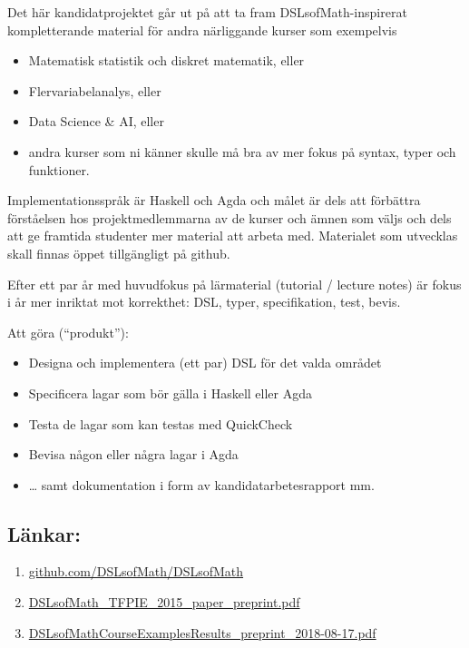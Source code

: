 \documentclass{article}
\providecommand{\tightlist}{%
  \setlength{\itemsep}{0pt}\setlength{\parskip}{0pt}}
\begin{document}
Det här kandidatprojektet går ut på att ta fram DSLsofMath-inspirerat
kompletterande material för andra närliggande kurser som exempelvis

\begin{itemize}
\tightlist
\item
  Matematisk statistik och diskret matematik, eller
\item
  Flervariabelanalys, eller
\item
  Data Science \& AI, eller
\item
  andra kurser som ni känner skulle må bra av mer fokus på syntax, typer
  och funktioner.
\end{itemize}

Implementationsspråk är Haskell och Agda och målet är dels att förbättra
förståelsen hos projekt\-medlemmarna av de kurser och ämnen som väljs och
dels att ge framtida studenter mer material att arbeta med. Materialet
som utvecklas skall finnas öppet tillgängligt på github.

Efter ett par år med huvudfokus på lärmaterial (tutorial / lecture
notes) är fokus i år mer inriktat mot korrekthet: DSL, typer,
specifikation, test, bevis.

\pagebreak
Att göra (``produkt''):

\begin{itemize}
\tightlist
\item
  Designa och implementera (ett par) DSL för det valda området
\item
  Specificera lagar som bör gälla i Haskell eller Agda
\item
  Testa de lagar som kan testas med QuickCheck
\item
  Bevisa någon eller några lagar i Agda
\item
  \ldots{} samt dokumentation i form av kandidatarbetesrapport mm.
\end{itemize}

\subsection{Länkar:}\label{luxe4nkar}

\begin{enumerate}
\def\labelenumi{\arabic{enumi}.}
\tightlist
\item \href{https://github.com/DSLsofMath/DSLsofMath}{github.com/DSLsofMath/DSLsofMath}
\item \href{https://www.cse.chalmers.se/~patrikj/papers/Ionescu_Jansson_DSLsofMath_TFPIE_2015_paper_preprint.pdf}{DSLsofMath\_TFPIE\_2015\_paper\_preprint.pdf}
\item \href{https://www.cse.chalmers.se/~patrikj/papers/Janssonetal_DSLsofMathCourseExamplesResults_preprint_2018-08-17.pdf}{DSLsofMathCourseExamplesResults\_preprint\_2018-08-17.pdf}
\end{enumerate}
\end{document}
